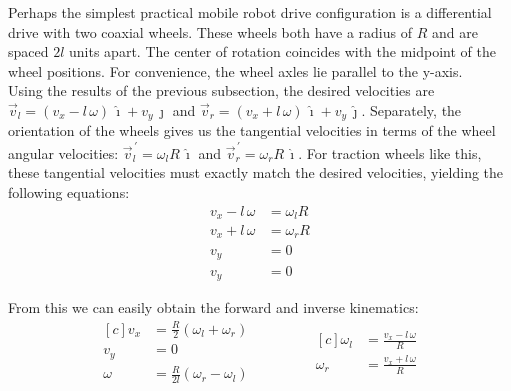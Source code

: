 \documentclass{article}
\newcommand{\pvec}[1]{\vec{#1}^{\,\prime}}
\begin{document}
Perhaps the simplest practical mobile robot drive configuration is a differential drive with two coaxial wheels. These wheels both have a radius of $R$ and are spaced $2l$ units apart. The center of rotation coincides with the midpoint of the wheel positions. For convenience, the wheel axles lie parallel to the y-axis.\\

Using the results of the previous subsection, the desired velocities are $\vec{v}_l = (v_x - l \, \omega) \, \hat{\imath} + v_y \, \hat{\jmath}$ and $\vec{v}_r = (v_x + l \, \omega) \, \hat{\imath} + v_y \, \hat{\jmath}$. Separately, the orientation of the wheels gives us the tangential velocities in terms of the wheel angular velocities: $\pvec{v}_l = \omega_l R \, \hat{\imath}$ and $\pvec{v}_r = \omega_r R \, \hat{\imath}$. For traction wheels like this, these tangential velocities must exactly match the desired velocities, yielding the following equations:
\begin{align*}
    v_x - l \, \omega &= \omega_l R \\
    v_x + l \, \omega &= \omega_r R \\
    v_y &= 0 \\
    v_y &= 0
\end{align*}

From this we can easily obtain the forward and inverse kinematics:
\begin{equation*}
    \begin{aligned}[c]
        v_x &= \frac{R}{2}(\omega_l + \omega_r) \\
        v_y &= 0 \\
        \omega &= \frac{R}{2l}(\omega_r - \omega_l)
    \end{aligned}
    \qquad\qquad
    \begin{aligned}[c]
        \omega_l &= \frac{v_x - l \, \omega}{R} \\
        \omega_r &= \frac{v_x + l \, \omega}{R}
    \end{aligned}
\end{equation*}
\end{document}
